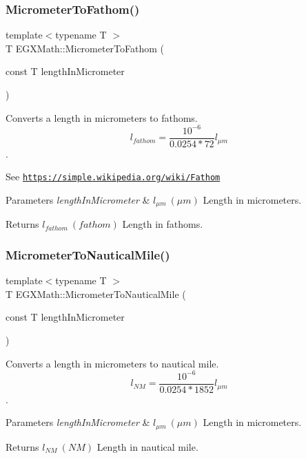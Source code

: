 \subsubsection{\texorpdfstring{Micrometer\+To\+Fathom()}{MicrometerToFathom()}}
{\footnotesize\ttfamily template$<$typename T $>$ \\
T E\+G\+X\+Math\+::\+Micrometer\+To\+Fathom (\begin{DoxyParamCaption}\item[{const T}]{length\+In\+Micrometer }\end{DoxyParamCaption})}



Converts a length in micrometers to fathoms. \[ l_{fathom}= \frac{10^{-6}}{0.0254 * 72} l_{\mu m} \]. 

See \href{https://simple.wikipedia.org/wiki/Fathom}{\tt https\+://simple.\+wikipedia.\+org/wiki/\+Fathom} 
\begin{DoxyParams}{Parameters}
{\em length\+In\+Micrometer} & $ l_{\mu m}\ (\mu m)$ Length in micrometers. \\
\hline
\end{DoxyParams}
\begin{DoxyReturn}{Returns}
$ l_{fathom}\ (fathom)$ Length in fathoms. 
\end{DoxyReturn}
\mbox{\label{group___e_g_x_math-_conversions-_length_conversions-_s_i-_micrometer-_nautical_ga43c5eb76a19baf316e06b38781369157}} 
\subsubsection{\texorpdfstring{Micrometer\+To\+Nautical\+Mile()}{MicrometerToNauticalMile()}}
{\footnotesize\ttfamily template$<$typename T $>$ \\
T E\+G\+X\+Math\+::\+Micrometer\+To\+Nautical\+Mile (\begin{DoxyParamCaption}\item[{const T}]{length\+In\+Micrometer }\end{DoxyParamCaption})}



Converts a length in micrometers to nautical mile. \[ l_{NM}= \frac{10^{-6}}{0.0254 * 1852} l_{\mu m} \]. 


\begin{DoxyParams}{Parameters}
{\em length\+In\+Micrometer} & $ l_{\mu m}\ (\mu m)$ Length in micrometers. \\
\hline
\end{DoxyParams}
\begin{DoxyReturn}{Returns}
$ l_{NM}\ (NM)$ Length in nautical mile. 
\end{DoxyReturn}
